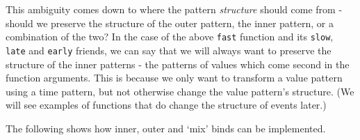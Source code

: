 This ambiguity comes down to where the pattern \emph{structure} should
come from - should we preserve the structure of the outer pattern, the
inner pattern, or a combination of the two? In the case of the above
\texttt{fast} function and its \texttt{slow}, \texttt{late} and
\texttt{early} friends, we can say that we will always want to preserve
the structure of the inner patterns - the patterns of values which come
second in the function arguments. This is because we only want to
transform a value pattern using a time pattern, but not otherwise change
the value pattern's structure. (We will see examples of functions that
do change the structure of events later.)

The following shows how inner, outer and `mix' binds can be implemented.

\begin{Shaded}
\begin{Highlighting}[]
\NormalTok{ (}  \OtherTok{{-}\textgreater{}}   \OtherTok{{-}\textgreater{}}  \NormalTok{) }\OtherTok{{-}\textgreater{}}
                \OtherTok{{-}\textgreater{}}\OtherTok{{-}\textgreater{}} \OtherTok{{-}\textgreater{}} 
\OtherTok{=}  \OperatorTok{$} 
  \OtherTok{=} \OperatorTok{$}\OperatorTok{$}\OperatorTok{$}
\OtherTok{=}\OtherTok{=}

 \OtherTok{{-}\textgreater{}}\OtherTok{{-}\textgreater{}} \OtherTok{{-}\textgreater{}} 
\OtherTok{=} \NormalTok{)}

 \OtherTok{{-}\textgreater{}}\OtherTok{{-}\textgreater{}} \OtherTok{{-}\textgreater{}} 
\OtherTok{=}

 \OtherTok{{-}\textgreater{}}\OtherTok{{-}\textgreater{}} \OtherTok{{-}\textgreater{}} 
\OtherTok{=}
\end{Highlighting}
\end{Shaded}

